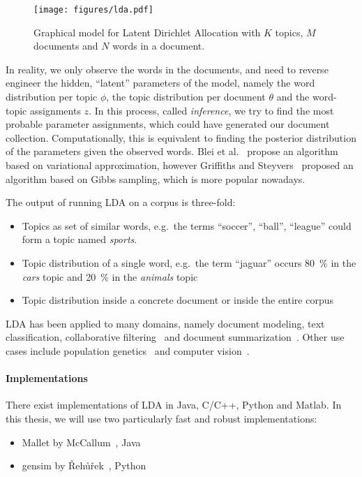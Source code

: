 \documentclass{sig-alternate-05-2015}
\begin{document}
\begin{figure}
       \centering
       \texttt{[image: figures/lda.pdf]}
       \caption{Graphical model for Latent Dirichlet Allocation with $K$ topics, $M$ documents and $N$ words in a document.}
       \label{fig:lda}
\end{figure}

In reality, we only observe the words in the documents, and need to reverse engineer the hidden, ``latent'' parameters of the model, namely the word distribution per topic $\phi$, the topic distribution per document $\theta$ and the word-topic assignments $z$.
In this process, called \emph{inference}, we try to find the most probable parameter assignments, which could have generated our document collection.
Computationally, this is equivalent to finding the posterior distribution of the parameters given the observed words.
Blei et al.~\cite{Blei2003} propose an algorithm based on variational approximation, however Griffiths and Steyvers~\cite{Griffiths2004} proposed an algorithm based on Gibbs sampling, which is more popular nowadays.

The output of running LDA on a corpus is three-fold:
\begin{itemize}
       \item Topics as set of similar words, e.g.\ the terms ``soccer'', ``ball'', ``league'' could form a topic named \emph{sports}.
       \item Topic distribution of a single word, e.g.\ the term ``jaguar'' occurs 80~\% in the \emph{cars} topic and 20~\% in the \emph{animals} topic
       \item Topic distribution inside a concrete document or inside the entire corpus
\end{itemize}

LDA has been applied to many domains, namely document modeling, text classification, collaborative filtering~\cite{Blei2003} and document summarization~\cite{Wang2009}.
Other use cases include population genetics~\cite{Pritchard2000} and computer vision~\cite{LiFei-Fei2005}.

\paragraph{Implementations}
There exist implementations of LDA in Java, C/C++, Python and Matlab.
In this thesis, we will use two particularly fast and robust implementations:
\begin{itemize}
       \item Mallet by McCallum~\cite{McCallum2002}, Java
       \item gensim by {\v R}eh{\r u}{\v r}ek~\cite{Rehurek2010}, Python
\end{itemize}
\end{document}
